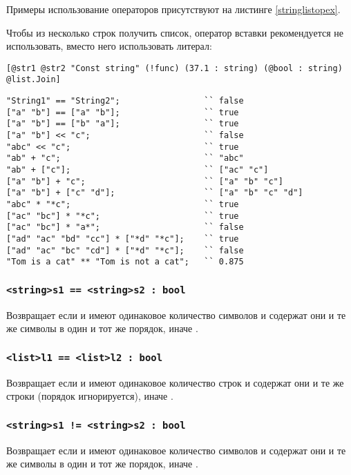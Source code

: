 \documentclass[a4paper, 14pt]{extarticle}
\begin{document}
Примеры использование операторов присутствуют на листинге \ref{stringlistopex}.

Чтобы из несколько строк получить список, оператор вставки рекомендуется не использовать, вместо него использовать литерал:
\begin{lstlisting}[numbers=none]
[@str1 @str2 "Const string" (!func) (37.1 : string) (@bool : string) @list.Join]
\end{lstlisting}

\begin{lstlisting}[caption=Примеры использования операторов над данными типа string и list, label=stringlistopex]
"String1" == "String2";					`` false
["a" "b"] == ["a" "b"];					`` true
["a" "b"] == ["b" "a"];					`` true
["a" "b"] << "c";						`` false
"abc" << "c";							`` true
"ab" + "c";								`` "abc"
"ab" + ["c"];							`` ["ac" "c"]
["a" "b"] + "c";						`` ["a" "b" "c"]
["a" "b"] + ["c" "d"];					`` ["a" "b" "c" "d"]
"abc" * "*c";							`` true
["ac" "bc"] * "*c";						`` true
["ac" "bc"] * "a*";						`` false
["ad" "ac" "bd" "cc"] * ["*d" "*c"];	`` true
["ad" "ac" "bc" "cd"] * ["*d" "*c"];	`` false
"Tom is a cat" ** "Tom is not a cat";	`` 0.875
\end{lstlisting}

\subsubsection{\lstinline`<string>s1 == <string>s2 : bool`}

Возвращает \true{} если  и  имеют одинаковое количество символов и содержат они и те же символы в один и тот же порядок, иначе \false{}.

\subsubsection{\lstinline`<list>l1 == <list>l2 : bool`}

Возвращает \true{} если  и  имеют одинаковое количество строк и содержат они и те же строки (порядок игнорируется), иначе \false{}.

\subsubsection{\lstinline`<string>s1 != <string>s2 : bool`}

Возвращает \false{} если  и  имеют одинаковое количество символов и содержат они и те же символы в один и тот же порядок, иначе \true{}.
\end{document}

